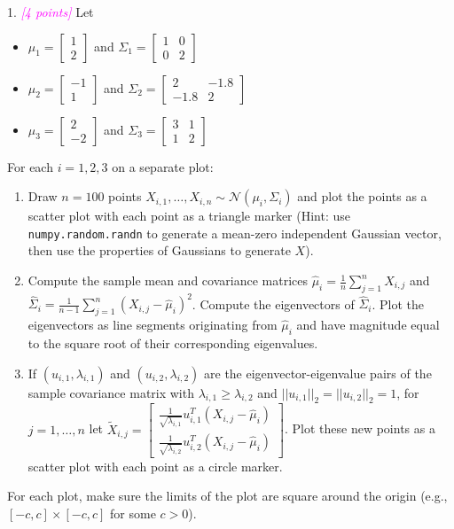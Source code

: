 \documentclass{article}
\newcommand{\1}{\mathbf{1}}
\newcommand{\grade}[1]{\small\textcolor{magenta}{\emph{[#1 points]}} \normalsize}
\begin{document}
1. \grade{4} Let 
\begin{itemize}
\item $\mu_1 = \begin{bmatrix} 1 \\ 2 \end{bmatrix}$ and $\Sigma_1 = \begin{bmatrix} 1 & 0 \\ 0 & 2 \end{bmatrix}$
\item $\mu_2 = \begin{bmatrix} -1 \\ 1 \end{bmatrix}$ and $\Sigma_2 = \begin{bmatrix} 2 & -1.8 \\ -1.8 & 2 \end{bmatrix}$
\item $\mu_3 = \begin{bmatrix} 2 \\ -2 \end{bmatrix}$ and $\Sigma_3 = \begin{bmatrix} 3 & 1 \\ 1 & 2 \end{bmatrix}$
\end{itemize}
For each $i=1,2,3$ on a separate plot:
\begin{enumerate}
  \item Draw $n=100$ points $X_{i,1},\dots,X_{i,n} \sim \mathcal{N}(\mu_i, \Sigma_i)$ and plot the points as a scatter plot with each point as a triangle marker (Hint: use \texttt{numpy.random.randn} to generate a mean-zero independent Gaussian vector, then use the properties of Gaussians to generate $X$).
  \item Compute the sample mean and covariance matrices $\widehat{\mu}_i = \frac{1}{n} \sum_{j=1}^n X_{i,j}$ and $\widehat{\Sigma}_i = \frac{1}{n-1} \sum_{j=1}^n (X_{i,j} - \widehat{\mu}_i)^2$. 
  Compute the eigenvectors of $\widehat{\Sigma}_i$. Plot the eigenvectors as line segments originating from $\widehat{\mu}_i$ and have magnitude equal to the square root of their corresponding eigenvalues.
  \item If $(u_{i,1},\lambda_{i,1})$ and $(u_{i,2},\lambda_{i,2})$ are the eigenvector-eigenvalue pairs of the sample covariance matrix with $\lambda_{i,1} \geq \lambda_{i,2}$ and $||u_{i,1}||_2 = ||u_{i,2}||_2 = 1$, for $j=1,\dots,n$ let $\widetilde{X}_{i,j} = \begin{bmatrix} \frac{1}{\sqrt{\lambda_{i,1}}} u_{i,1}^T (X_{i,j} - \widehat{\mu}_i) \\ \frac{1}{\sqrt{\lambda_{i,2}}} u_{i,2}^T (X_{i,j} - \widehat{\mu}_i)  \end{bmatrix}$. Plot these new points as a scatter plot with each point as a circle marker. 
\end{enumerate}
For each plot, make sure the limits of the plot are square around the origin (e.g., $[-c,c] \times [-c,c]$ for some $c > 0$).
\end{document}
